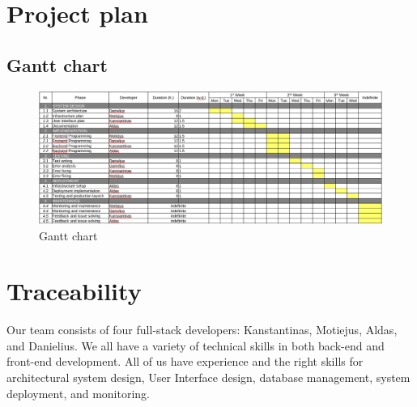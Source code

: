 \documentclass[
    english, %
]{VUMIFPSkursinis}
\begin{document}
\section{Project plan}

\subsection{Gantt chart}

\begin{figure}[ht]
    \centering
    \includegraphics[width=\textwidth]{../lab3diags/Gantt_image.png}
    \caption{Gantt chart}
    \label{gantt-table}
\end{figure}

\section{Traceability}

Our team consists of four full-stack developers: Kanstantinas, Motiejus, Aldas, and Danielius. We all have a variety of technical skills in both back-end and front-end development. All of us have experience and the right skills for architectural system design, User Interface design, database management, system deployment, and monitoring.
\end{document}
